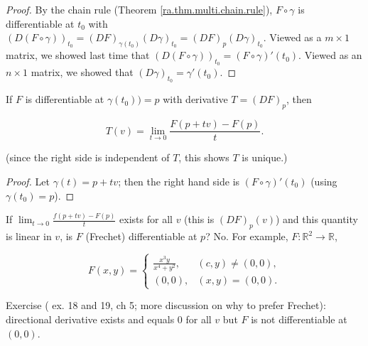 \begin{proof}

By the chain rule (Theorem \ref{ra.thm.multi.chain.rule}), \(F \circ \gamma\) is differentiable at \(t_0\) with \((D(F \circ \gamma))_{t_0} = (DF)_{\gamma(t_0)} (D \gamma)_{t_0} =  (DF)_{p} (D \gamma)_{t_0}\). Viewed as a \(m \times 1\) matrix, we showed last time that \((D(F \circ \gamma))_{t_0} = (F \circ \gamma)'(t_0)\). Viewed as an \(n \times 1\) matrix, we showed that \((D \gamma)_{t_0} = \gamma'(t_0)\).

\end{proof}
 
 \begin{corollary}
 
 If \(F\) is differentiable at \(\gamma(t_0)) =p\) with derivative \(T = (DF)_p\), then 
 
 \[
 T(v) = \lim_{t \to 0} \frac{F(p+tv) - F(p)}{t}.
 \]
 
  (since the right side is independent of \(T\), this shows \(T\) is unique.)
 
 \end{corollary}
 
 \begin{proof}
 
 Let \(\gamma(t) = p + tv\); then the right hand side is \((F \circ \gamma)'(t_0)\) (using \(\gamma(t_0) = p\)).
 
 \end{proof}
 
 If \(\lim_{t \to 0} \frac{f(p+tv) - F(p)}{t}\) exists for all \(v\) (this is \((DF)_p(v)\)) and this quantity is linear in \(v\), is \(F\) (Frechet) differentiable at \(p\)? No. For example, \(F: \mathbb{R}^2 \to \mathbb{R}\), 
 
 \[
 F(x,y) = \begin{cases} 
 \frac{x^3 y}{x^4 + y^2}, & (c, y) \neq (0,0), \\
 (0, 0), & (x,y) = (0,0).
 \end{cases}
 \]
 
 Exercise (\citet{pugh2015real} ex. 18 and 19, ch 5; more discussion on why to prefer Frechet): directional derivative exists and equals 0 for all \(v\) but \(F\) is not differentiable at \((0,0)\). 
 
